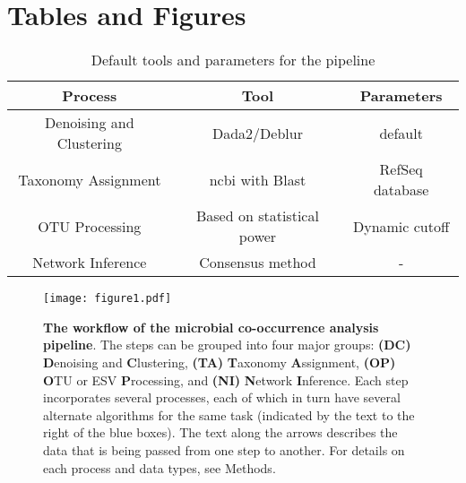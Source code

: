 
\newpage
\section*{Tables and Figures}


  \begin{table}[h]
    \centering
    \small
    \begin{tabular}{|c|c|c|}
      \hline
      \textbf{Process} & \textbf{Tool} & \textbf{Parameters} \\
      \hline
      Denoising and Clustering & Dada2/Deblur & default \\
      Taxonomy Assignment & \ac{ncbi} with Blast & RefSeq database \\
      OTU Processing & Based on statistical power & Dynamic cutoff \\
      Network Inference & Consensus method & - \\
      \hline
    \end{tabular}
    \caption{Default tools and parameters for the pipeline}
    \label{tab:default_options}
  \end{table}


  \begin{figure}[H]
    \centering
    \texttt{[image: figure1.pdf]}
  \end{figure}
  \begin{figure}[H]
    \centering
    \caption{
      \textbf{The workflow of the microbial co-occurrence analysis pipeline}.
      The steps can be grouped into four major groups: \textbf{(DC)} \textbf{D}enoising and \textbf{C}lustering, \textbf{(TA)} \textbf{T}axonomy \textbf{A}ssignment, \textbf{(OP)} \textbf{O}TU or ESV \textbf{P}rocessing, and \textbf{(NI)} \textbf{N}etwork \textbf{I}nference.
      Each step incorporates several processes, each of which in turn have several alternate algorithms for the same task (indicated by the text to the right of the blue boxes).
      The text along the arrows describes the data that is being passed from one step to another. For details on each process and data types, see Methods.
    }
    \label{fig:figure1}
  \end{figure}

  \FloatBarrier
  \newpage

